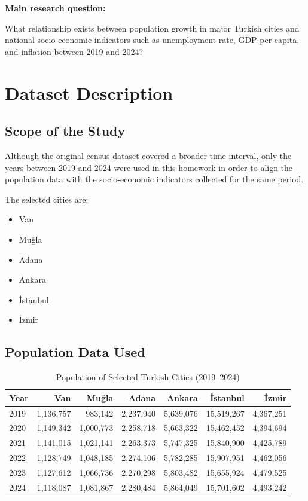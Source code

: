 \documentclass[11pt,a4paper]{article}
\begin{document}
\textbf{Main research question:}

What relationship exists between population growth in major Turkish cities and national socio-economic indicators such as unemployment rate, GDP per capita, and inflation between 2019 and 2024?

\section{Dataset Description}

\subsection{Scope of the Study}

Although the original census dataset covered a broader time interval, only the years between 2019 and 2024 were used in this homework in order to align the population data with the socio-economic indicators collected for the same period.

The selected cities are:
\begin{itemize}[leftmargin=1.5em]
    \item Van
    \item Muğla
    \item Adana
    \item Ankara
    \item İstanbul
    \item İzmir
\end{itemize}

\subsection{Population Data Used}

\begin{table}[H]
\centering
\caption{Population of Selected Turkish Cities (2019--2024)}
\small
\begin{tabular}{lrrrrrr}
\toprule
\textbf{Year} & \textbf{Van} & \textbf{Muğla} & \textbf{Adana} & \textbf{Ankara} & \textbf{İstanbul} & \textbf{İzmir} \\
\midrule
2019 & 1,136,757 & 983,142 & 2,237,940 & 5,639,076 & 15,519,267 & 4,367,251 \\
2020 & 1,149,342 & 1,000,773 & 2,258,718 & 5,663,322 & 15,462,452 & 4,394,694 \\
2021 & 1,141,015 & 1,021,141 & 2,263,373 & 5,747,325 & 15,840,900 & 4,425,789 \\
2022 & 1,128,749 & 1,048,185 & 2,274,106 & 5,782,285 & 15,907,951 & 4,462,056 \\
2023 & 1,127,612 & 1,066,736 & 2,270,298 & 5,803,482 & 15,655,924 & 4,479,525 \\
2024 & 1,118,087 & 1,081,867 & 2,280,484 & 5,864,049 & 15,701,602 & 4,493,242 \\
\bottomrule
\end{tabular}
\end{table}
\end{document}
